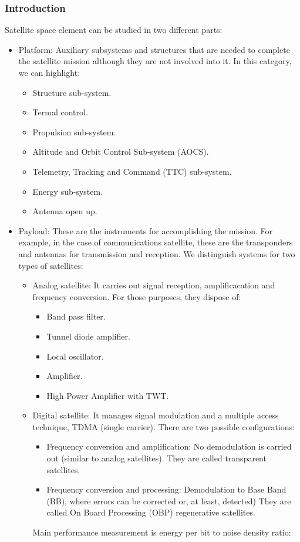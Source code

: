 \documentclass[../main.tex]{subfiles}
\begin{document}
\subsubsection{Introduction}

Satellite space element can be studied in two different parts:
\begin{itemize}
	\item {
		Platform: Auxiliary subsystems and structures that are needed to complete the satellite mission although they are not involved into it. In this category, we can highlight:
		\begin{itemize}
			\item Structure sub-system.
			\item Termal control.
			\item Propulsion sub-system.
			\item Altitude and Orbit Control Sub-system (AOCS).
			\item Telemetry, Tracking and Command (TTC) sub-system.
			\item Energy sub-system.
			\item Antenna open up.
		\end{itemize}
	}
	\item {
		Payload: These are the instruments for accomplishing the mission. For example, in the case of communications satellite, these are the transponders and antennas for transmission and reception. We distinguish systems for two types of satellites:
		\begin{itemize}
			\item {
				Analog satellite: It carries out signal reception, amplificacation and frequency conversion. For those purposes, they dispose of:
				\begin{itemize}
					\item Band pass filter.
					\item Tunnel diode amplifier.
					\item Local oscillator.
					\item Amplifier.
					\item High Power Amplifier with TWT.
				\end{itemize}
			}
			\item {
				Digital satellite: It manages signal modulation and a multiple access technique, TDMA (single carrier). There are two possible configurations:
				\begin{itemize}
					\item Frequency conversion and amplification: No demodulation  is carried out (similar to analog satellites). They are called transparent satellites.
					\item Frequency conversion and processing: Demodulation to Base Band (BB), where errors can be corrected or, at least, detected) They are called On Board Processing (OBP) regenerative satellites.
				\end{itemize}
				Main performance measurement is energy per bit to noise density ratio:

}
\end{itemize}}
\end{itemize}
\end{document}
